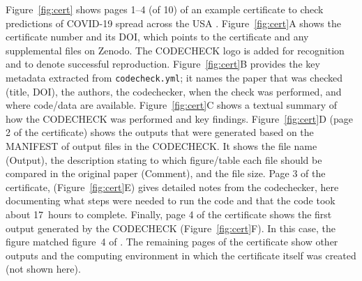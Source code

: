 \documentclass[12pt]{article}
\begin{document}
Figure~\ref{fig:cert} shows pages 1--4 (of 10) of an example
certificate to check predictions of COVID-19 spread across the USA
\cite{cert-2020-012,unwin_report_2020}.  Figure~\ref{fig:cert}A shows
the certificate number and its DOI, which points to the certificate
and any supplemental files on Zenodo.  The CODECHECK logo is added for
recognition and to denote successful reproduction.
Figure~\ref{fig:cert}B provides the key metadata extracted from
\texttt{codecheck.yml}; it names the paper that was checked (title,
DOI), the authors, the codechecker, when the check was performed, and
where code/data are available.
Figure~\ref{fig:cert}C shows a textual summary of how the CODECHECK
was performed and key findings.  Figure~\ref{fig:cert}D
(page 2 of the certificate) shows the outputs that were generated
based on the MANIFEST of output files in the CODECHECK.  It shows the
file name (Output), the description stating to which figure/table each
file should be compared in the original paper (Comment), and the file
size.  Page 3 of the certificate, (Figure~\ref{fig:cert}E) gives
detailed notes from the codechecker, here documenting what steps were
needed to run the code and that the code took about 17~hours to
complete. Finally, page 4 of the certificate shows the first output
generated by the CODECHECK (Figure~\ref{fig:cert}F). In this case, the
figure matched figure~4 of \cite{unwin_report_2020}.  The remaining
pages of the certificate show other outputs and the computing
environment in which the certificate itself was created (not shown
here).
\end{document}
